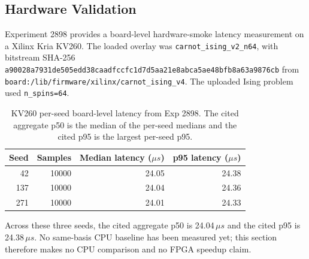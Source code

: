 \subsection{Hardware Validation}
\label{sec:hardware-validation}
Experiment 2898 provides a board-level hardware-smoke latency measurement on a Xilinx Kria KV260. The loaded overlay was \texttt{carnot\_ising\_v2\_n64}, with bitstream SHA-256 \texttt{a90028a7931de505edd38caadfccfc1d7d5aa21e8abca5ae48bfb8a63a9876cb} from \texttt{board:/lib/firmware/xilinx/carnot\_ising\_v4}. The uploaded Ising problem used \texttt{n\_spins=64}.

\begin{table}[ht]
  \centering
  \begin{tabular}{r r r r}
    \toprule
    Seed & Samples & Median latency ($\mu s$) & p95 latency ($\mu s$) \\
    \midrule
    42 & 10000 & 24.05 & 24.38 \\
    137 & 10000 & 24.04 & 24.36 \\
    271 & 10000 & 24.01 & 24.33 \\
    \bottomrule
  \end{tabular}
  \caption{KV260 per-seed board-level latency from Exp 2898. The cited aggregate p50 is the median of the per-seed medians and the cited p95 is the largest per-seed p95.}
  \label{tab:kv260-hardware-validation-v1}
\end{table}

Across these three seeds, the cited aggregate p50 is 24.04\,$\mu s$ and the cited p95 is 24.38\,$\mu s$. No same-basis CPU baseline has been measured yet; this section therefore makes no CPU comparison and no FPGA speedup claim.
